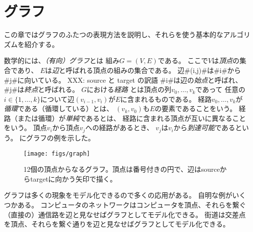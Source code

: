 \chapter{グラフ}


この章ではグラフのふたつの表現方法を説明し、それらを使う基本的なアルゴリズムを紹介する。

数学的には、\emph{（有向）グラフ}とは
%
%
組み$G=(V,E)$である。
ここで$V$は\emph{頂点}の集合であり、
%
$E$は\emph{辺}と呼ばれる頂点の組みの集合である。
%
辺#(i,j)#は#i#から#j#に向いている。
%
XXX: source と target の訳語 %
#i#は辺の\emph{始点}と呼ばれ、
#j#は\emph{終点}と呼ばれる。
$G$における\emph{経路}%
とは頂点の列$v_0,\ldots,v_k$であって 任意の$i\in\{1,\ldots,k\}$について辺$(v_{i-1},v_{i})$が$E$に含まれるものである。
経路$v_0,\ldots,v_k$が
\emph{循環}である（循環している）とは、
%
$(v_k,v_0)$も$E$の要素であることをいう。
経路（または循環）が\emph{単純}であるとは、
%
経路に含まれる頂点が互いに異なることをいう。
頂点$v_i$から頂点$v_j$への経路があるとき、
$v_j$は$v_i$から\emph{到達可能}であるという。
にグラフの例を示した。

\begin{figure}
  \begin{center}
    \texttt{[image: figs/graph]}
  \end{center}
  \caption{12個の頂点からなるグラフ。頂点は番号付きの円で、辺はsourceからtargetに向かう矢印で描く。}
\end{figure}

グラフは多くの現象をモデル化できるので多くの応用がある。
自明な例がいくつかある。
コンピュータのネットワークはコンピュータを頂点、それらを繋ぐ（直接の）通信路を辺と見なせばグラフとしてモデル化できる。
街道は交差点を頂点、それらを繋ぐ通りを辺と見なせばグラフとしてモデル化できる。

